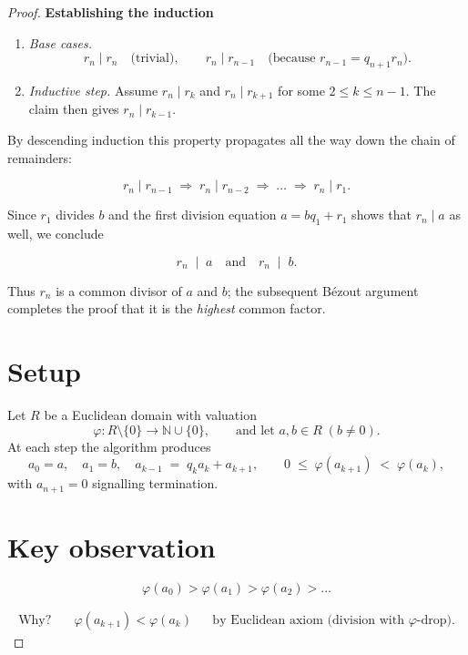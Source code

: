 \documentclass[12pt]{article}
\theoremstyle{definition} %
\theoremstyle{plain} %
\begin{document}
\begin{proof}
\bigskip
\textbf{Establishing the induction}

\begin{enumerate}
  \item \emph{Base cases.}
        \[
          r_{n}\mid r_{n}\quad\text{(trivial)},\qquad
          r_{n}\mid r_{n-1}\quad\text{(because }r_{n-1}=q_{n+1}r_{n}).
        \]
  \item \emph{Inductive step.}\;
        Assume $r_{n}\mid r_{k}$ and $r_{n}\mid r_{k+1}$ for some
        $2\le k\le n-1$.  
        The claim then gives $r_{n}\mid r_{k-1}$.
\end{enumerate}

By descending induction this property propagates all the way down the
chain of remainders:

\[
   r_{n}\mid r_{n-1}\;\Rightarrow\;
   r_{n}\mid r_{n-2}\;\Rightarrow\;\dots\;\Rightarrow\;
   r_{n}\mid r_{1}.
\]

Since $r_{1}$ divides $b$ and the first division equation
$a=bq_{1}+r_{1}$ shows that $r_{n}\mid a$ as well, we conclude

\[
   r_{n}\;\mid\; a
   \quad\text{and}\quad
   r_{n}\;\mid\; b.
\]

Thus $r_{n}$ is a common divisor of $a$ and $b$; the subsequent Bézout
argument completes the proof that it is the \emph{highest} common
factor.
\section*{Setup}

Let \(R\) be a Euclidean domain with valuation  
\[
   \varphi : R\setminus\{0\}\longrightarrow \mathbb N\cup\{0\},
   \qquad
   \text{and let } a,b\in R\;(b\ne0).
\]
At each step the algorithm produces
\[
   a_0 = a,\quad a_1 = b,\quad 
   a_{k-1} \;=\; q_{k}a_k + a_{k+1},
   \qquad
   0\;\le\;\varphi(a_{k+1})\;<\;\varphi(a_{k}),
\]
with \(a_{n+1}=0\) signalling termination.

\medskip
\section*{Key observation}

\[
   \boxed{\;
      \varphi(a_{0}) > \varphi(a_{1}) > \varphi(a_{2}) > \dots
   \;}
\]

\begin{align}
\text{Why?}\quad
  &\varphi(a_{k+1}) < \varphi(a_{k})
    &&\text{by Euclidean axiom (division with \(\varphi\)-drop).}
\end{align}


\end{proof}
\end{document}
